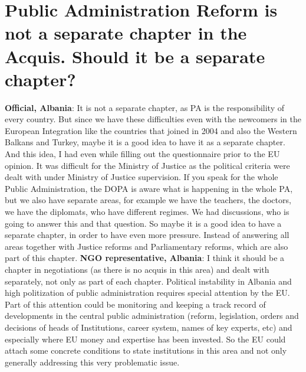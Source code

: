 \section{ Public Administration Reform is not a separate chapter in the Acquis. Should it be a separate chapter?}
\textbf{Official, Albania}: It is not a separate chapter, as PA is the responsibility of every country. But since we have these difficulties even with the newcomers in the European Integration like the countries that joined in 2004 and also the Western Balkans and Turkey, maybe it is a good idea to have it as a separate chapter. And this idea, I had even while filling out the questionnaire prior to the EU opinion. It was difficult for the Ministry of Justice as the political criteria were dealt with under Ministry of Justice supervision. If you speak for the whole Public Administration, the DOPA is aware what is happening in the whole PA, but we also have separate areas, for example we have the teachers, the doctors, we have the diplomats, who have different regimes. We had discussions, who is going to answer this and that question. So maybe it is a good idea to have a separate chapter, in order to have even more pressure. Instead of answering all areas together with Justice reforms and Parliamentary reforms, which are also part of this chapter.
\textbf{NGO representative, Albania}: I think it should be a chapter in negotiations (as there is no acquis in this area) and dealt with separately, not only as part of each chapter. Political instability in Albania and high politization of public administration requires special attention by the EU. Part of this attention could be monitoring and keeping a track record of developments in the central public administration (reform, legislation, orders and decisions of heads of Institutions, career system, names of key experts, etc) and especially where EU money and expertise has been invested. So the EU could attach some concrete conditions to state institutions in this area and not only generally addressing this very problematic issue. 
